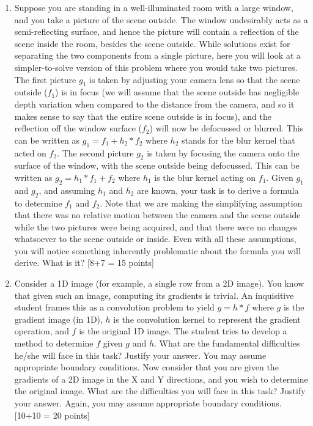 \documentclass[11pt]{article}
\begin{document}
\begin{enumerate}
\item Suppose you are standing in a well-illuminated room with a large window, and you take a picture of the scene outside. The window undesirably acts as a semi-reflecting surface, and hence the picture will contain a reflection of the scene inside the room, besides the scene outside. While solutions exist for separating the two components from a single picture, here you will look at a simpler-to-solve version of this problem where you would take two pictures. The first picture $g_1$ is taken by adjusting your camera lens so that the scene outside ($f_1$) is in focus (we will assume that the scene outside has negligible depth variation when compared to the distance from the camera, and so it makes sense to say that the entire scene outside is in focus), and the reflection off the window surface ($f_2$) will now be defocussed or blurred.  This can be written as $g_1 = f_1 + h_2 * f_2$ where $h_2$ stands for the blur kernel that acted on $f_2$. The second picture $g_2$ is taken by focusing the camera onto the surface of the window, with the scene outside being defocussed. This can be written as $g_2 = h_1 * f_1 + f_2$ where $h_1$ is the blur kernel acting on $f_1$. Given $g_1$ and $g_2$, and assuming $h_1$ and $h_2$ are known, your task is to derive a formula to determine $f_1$ and $f_2$. Note that we are making the simplifying assumption that there was no relative motion between the camera and the scene outside while the two pictures were being acquired, and that there were no changes whatsoever to the scene outside or inside. Even with all these assumptions, you will notice something inherently problematic about the formula you will derive. What is it? \textsf[8+7 = 15 points]

\item Consider a 1D image (for example, a single row from a 2D image). You know that given such an image, computing its gradients is trivial. An inquisitive student frames this as a convolution problem to yield $g = h*f$ where $g$ is the gradient image (in 1D), $h$ is the convolution kernel to represent the gradient operation, and $f$ is the original 1D image. The student tries to develop a method to determine $f$ given $g$ and $h$. What are the fundamental difficulties he/she will face in this task? Justify your answer. You may assume appropriate boundary conditions. Now consider that you are given the gradients of a 2D image in the X and Y directions, and you wish to determine the original image. What are the difficulties you will face in this task? Justify your answer. Again, you may assume appropriate boundary conditions. \textsf{[10+10 = 20 points]}


\end{enumerate}
\end{document}
